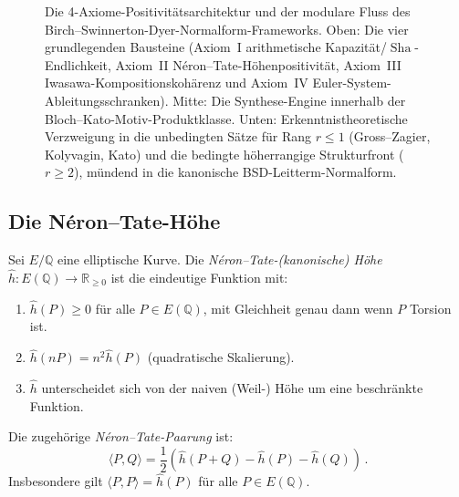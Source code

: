 \documentclass[aps,prd,twocolumn,superscriptaddress,nofootinbib,floatfix]{revtex4-2}
\theoremstyle{definition}
\theoremstyle{remark}
\DeclareMathOperator{\Sha}{Sha}
\begin{document}
\begin{figure}[t]
{%
}
\caption{Die 4-Axiome-Positivitätsarchitektur und der modulare Fluss des Birch--Swinnerton-Dyer-Normalform-Frameworks. Oben: Die vier grundlegenden Bausteine (Axiom~I arithmetische Kapazität/$\Sha$-Endlichkeit, Axiom~II Néron--Tate-Höhenpositivität, Axiom~III Iwasawa-Kompositionskohärenz und Axiom~IV Euler-System-Ableitungsschranken). Mitte: Die Synthese-Engine innerhalb der Bloch--Kato-Motiv-Produktklasse. Unten: Erkenntnistheoretische Verzweigung in die unbedingten Sätze für Rang $r \leq 1$ (Gross--Zagier, Kolyvagin, Kato) und die bedingte höherrangige Strukturfront ($r \geq 2$), mündend in die kanonische BSD-Leitterm-Normalform.}
\label{fig:bsd_architecture}
\end{figure}

\subsection{Die Néron--Tate-Höhe}

Sei $E/\mathbb{Q}$ eine elliptische Kurve. Die \textit{Néron--Tate-(kanonische) Höhe} $\hat{h}: E(\mathbb{Q}) \to \mathbb{R}_{\geq 0}$ ist die eindeutige Funktion mit:
\begin{enumerate}
\item $\hat{h}(P) \geq 0$ für alle $P \in E(\mathbb{Q})$, mit Gleichheit genau dann wenn $P$ Torsion ist.
\item $\hat{h}(nP) = n^2 \hat{h}(P)$ (quadratische Skalierung).
\item $\hat{h}$ unterscheidet sich von der naiven (Weil-) Höhe um eine beschränkte Funktion.
\end{enumerate}

Die zugehörige \textit{Néron--Tate-Paarung} ist:
\begin{equation}
\langle P, Q \rangle = \frac{1}{2}\left(\hat{h}(P+Q) - \hat{h}(P) - \hat{h}(Q)\right)\,.
\label{eq:NT_pairing}
\end{equation}
Insbesondere gilt $\langle P, P \rangle = \hat{h}(P)$ für alle $P \in E(\mathbb{Q})$.
\end{document}
